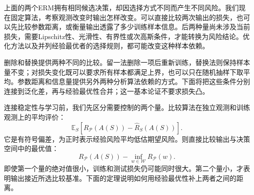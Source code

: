 上面的两个ERM拥有相同候选决策，却因选择方式不同而产生不同风险。我们现在固定算法，考察观测改变时输出怎样改变。可以直接比较两次输出的损失，也可以先比较参数距离，或衡量输出透露了多少训练样本信息。后两种量尚未涉及当前损失，需要Lipschitz性、光滑性、有界性或次高斯条件，才能转换为风险结论。优化方法以及并列经验最优者的选择规则，都可能改变这种样本依赖。

删除和替换提供两种不同的比较。留一法删除一项后重新训练，替换法则保持样本量不变；对损失变化既可以要求所有样本都满足上界，也可以只在随机抽样下取平均。参数距离和信息量提供另外两种分析算法依赖的方式。下面将把这些条件分别连接到泛化差，再与经验最优性合并；这一基本论证不要求损失凸。

连接稳定性与学习前，我们先区分需要控制的两个量。比较算法在独立观测和训练观测上的平均评价：
\[
 \mathbb E_S[R_{\mathcal P}(A(S))-\hat R_S(A(S))].
\]
它是有符号偏差，为正时表示经验风险平均低估期望风险。则直接比较输出与决策空间中的最优值：
\[
 R_{\mathcal P}(A(S))-\inf_{w\in\mathcal W}R_{\mathcal P}(w).
\]
即使第一个量的绝对值很小，训练和测试损失仍可能同时很大。第二个量小，才表明输出接近所选比较基准。下面的定理说明如何用经验最优性补上两者之间的距离。

